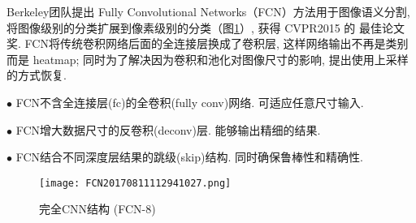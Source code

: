 Berkeley团队提出 Fully Convolutional Networks（FCN）方法用于图像语义分割, 将图像级别的分类扩展到像素级别的分类（图\ref{FCN20170811112941027}）, 获得 CVPR2015 的 最佳论文奖\cite{Long2015-9593}.
FCN将传统卷积网络后面的全连接层换成了卷积层, 这样网络输出不再是类别而是 heatmap; 同时为了解决因为卷积和池化对图像尺寸的影响, 提出使用上采样的方式恢复.

$\bullet$ FCN不含全连接层(fc)的全卷积(fully conv)网络. 可适应任意尺寸输入.

$\bullet$ FCN增大数据尺寸的反卷积(deconv)层. 能够输出精细的结果.

$\bullet$ FCN结合不同深度层结果的跳级(skip)结构. 同时确保鲁棒性和精确性.
\begin{figure}[H]
\centering
\texttt{[image: FCN20170811112941027.png]}
\caption{完全CNN结构 (FCN-8)\cite{}}
\label{FCN20170811112941027}
\vspace{-0.4cm}
\end{figure}


